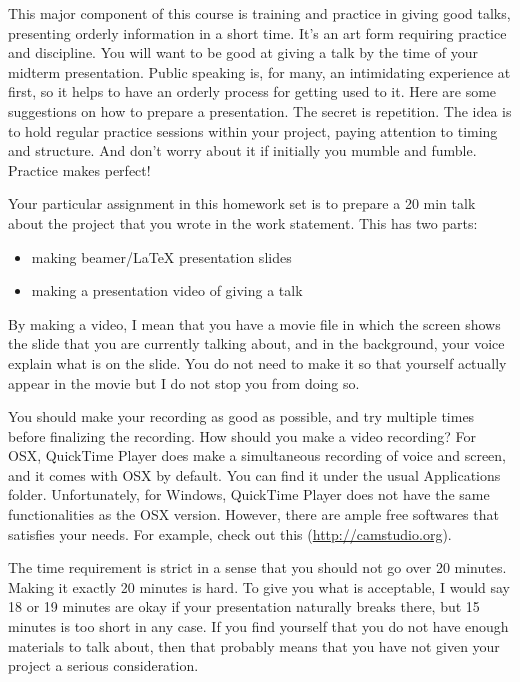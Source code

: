 \documentclass[12pt]{article}
\begin{document}
This major component of this course is training and practice in
giving good talks, presenting orderly information in a short
time. It's an art form requiring practice and discipline. You will
want to be good at giving a talk by the time of your midterm
presentation.  Public speaking is, for many, an intimidating experience at first, so
it helps to have an orderly process for getting used to it. Here are
some suggestions on how to prepare a presentation. 
The secret is repetition. The idea is to hold regular
practice sessions within your project, paying attention to timing and
structure. And don't worry about it if initially you mumble and
fumble. Practice makes perfect!

Your particular assignment in this homework set is to prepare a 20 min 
talk about the project that  you wrote in the work statement. This has two 
parts: 

\begin{itemize}
\item making beamer/LaTeX presentation slides 
\item making a presentation video of giving a talk
\end{itemize}

By making a video, I mean that you have a movie
file in which the screen shows the slide that you 
are currently talking about, and in the background,
your voice explain what is on the slide. You do 
not need to make it so that yourself actually 
appear in the movie but I do not stop you from 
doing so. 

You should make your recording as good as possible,
and try multiple times before finalizing the recording. 
How should you make a video recording? 
For OSX, QuickTime Player does make a 
simultaneous recording of voice and screen, and it 
comes with OSX by default. You can find it under 
the usual Applications folder.  
Unfortunately, for Windows, QuickTime Player does not 
have the same functionalities as the OSX version. However, 
there are ample free softwares that satisfies your needs. 
For example, check out this (\url{http://camstudio.org}).


The time requirement is strict in a sense that 
you should not go over 20 minutes. Making 
it exactly 20 minutes is hard. To give you 
what is acceptable, I would say 18 or 19 minutes 
are okay if your presentation naturally breaks there,
but 15 minutes is too short in any case. 
If you find yourself that you do not have enough 
materials to talk about, then that probably means 
that you have not given your project a serious 
consideration.
\end{document}
